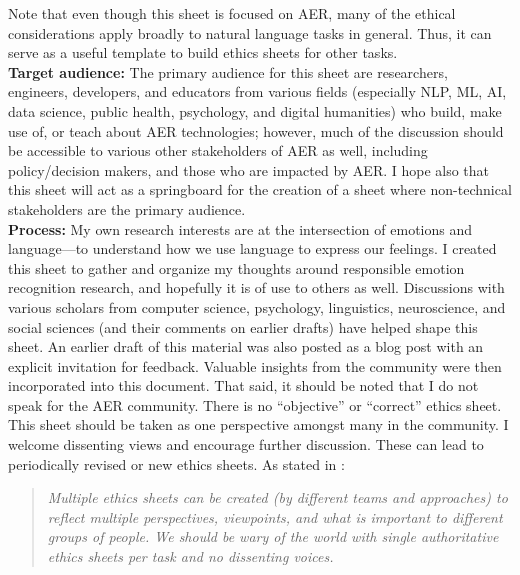 \documentclass{clv3}
\begin{document}
\vspace*{-2mm}
\noindent Note that even though this sheet is focused on AER, many of the ethical considerations apply broadly to natural language tasks in general. Thus, it can serve as a useful template to build ethics sheets for other tasks.\\[5pt]
\noindent \textbf{Target audience:} The primary audience for this sheet are researchers, engineers, developers, and educators from various fields (especially NLP, ML, AI, data science, public health, psychology, and digital humanities) who build, make use of, or teach about AER technologies; however, much of the discussion should be accessible to various other stakeholders of AER as well, including %
policy/decision makers, and those who are impacted by AER.
I hope also %
that this sheet will act as a springboard for the
creation of a sheet where non-technical stakeholders are the primary audience.\\[5pt]
\noindent \textbf{Process:} My own research interests are at the intersection of emotions and language---to understand how we use language to express our feelings. I created this sheet to gather and organize my thoughts around responsible emotion recognition research, and hopefully it is of use to others as well. Discussions with various scholars from computer science, psychology, linguistics, neuroscience, and social sciences (and their comments on earlier drafts) have helped shape this sheet. An earlier draft of this material was also posted as a blog post with an explicit invitation for feedback. Valuable insights from the community were then incorporated into this document. %
That said, it should be noted that I do not speak for the AER community. There is no “objective” or ``correct” ethics sheet. This sheet should be taken as one perspective amongst many in the community. I welcome dissenting views and encourage further discussion. These can lead to periodically revised or new ethics sheets. As stated in \citet{mohammad2021ethics}:\\[-15pt]
\begin{quote}
\textit{Multiple ethics sheets can be created (by different teams and approaches) 
to reflect multiple perspectives, viewpoints, and what is important to different groups of people.
We should be wary of the world with single authoritative ethics sheets per task and no dissenting voices.}
\end{quote}%
\end{document}
